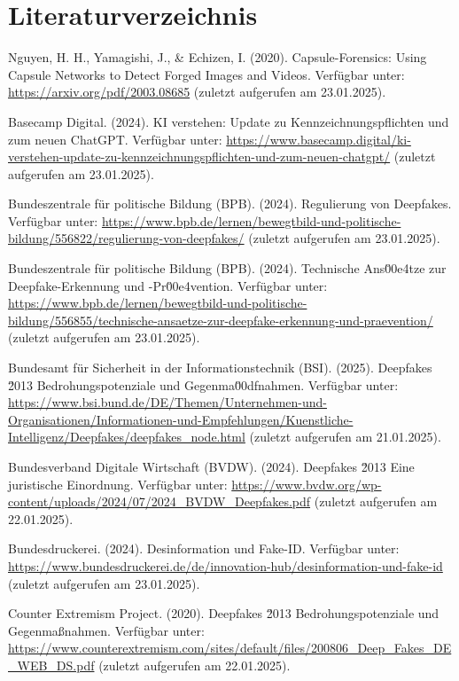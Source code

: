 \documentclass[a4paper,12pt]{article}
\begin{document}
\section*{Literaturverzeichnis}
\begin{thebibliography}{99}
     Nguyen, H. H., Yamagishi, J., \& Echizen, I. (2020). Capsule-Forensics: Using Capsule Networks to Detect Forged Images and Videos.
    Verfügbar unter: \url{https://arxiv.org/pdf/2003.08685} (zuletzt aufgerufen am 23.01.2025).
    
     Basecamp Digital. (2024). KI verstehen: Update zu Kennzeichnungspflichten und zum neuen ChatGPT. 
    Verfügbar unter: \url{https://www.basecamp.digital/ki-verstehen-update-zu-kennzeichnungspflichten-und-zum-neuen-chatgpt/} (zuletzt aufgerufen am 23.01.2025).
    
     Bundeszentrale für politische Bildung (BPB). (2024). Regulierung von Deepfakes. 
    Verfügbar unter: \url{https://www.bpb.de/lernen/bewegtbild-und-politische-bildung/556822/regulierung-von-deepfakes/} (zuletzt aufgerufen am 23.01.2025). 
    
     Bundeszentrale für politische Bildung (BPB). (2024). Technische Ans\u00e4tze zur Deepfake-Erkennung und -Pr\u00e4vention. 
    Verfügbar unter: \url{https://www.bpb.de/lernen/bewegtbild-und-politische-bildung/556855/technische-ansaetze-zur-deepfake-erkennung-und-praevention/} (zuletzt aufgerufen am 23.01.2025).
    
     Bundesamt für Sicherheit in der Informationstechnik (BSI). (2025). Deepfakes \u2013 Bedrohungspotenziale und Gegenma\u00dfnahmen. 
    Verfügbar unter: \url{https://www.bsi.bund.de/DE/Themen/Unternehmen-und-Organisationen/Informationen-und-Empfehlungen/Kuenstliche-Intelligenz/Deepfakes/deepfakes_node.html} (zuletzt aufgerufen am 21.01.2025).
    
     Bundesverband Digitale Wirtschaft (BVDW). (2024). Deepfakes \u2013 Eine juristische Einordnung. 
    Verfügbar unter: \url{https://www.bvdw.org/wp-content/uploads/2024/07/2024_BVDW_Deepfakes.pdf} (zuletzt aufgerufen am 22.01.2025). 
    
     Bundesdruckerei. (2024). Desinformation und Fake-ID. 
    Verfügbar unter: \url{https://www.bundesdruckerei.de/de/innovation-hub/desinformation-und-fake-id} (zuletzt aufgerufen am 23.01.2025). 
    
     Counter Extremism Project. (2020). Deepfakes \u2013 Bedrohungspotenziale und Gegenmaßnahmen.
    Verfügbar unter: \url{https://www.counterextremism.com/sites/default/files/200806_Deep_Fakes_DE_WEB_DS.pdf} (zuletzt aufgerufen am 22.01.2025).
    

\end{thebibliography}
\end{document}
